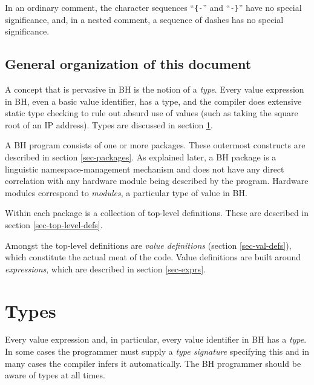 \documentclass[twoside,letterpaper]{article}
\newcommand{\BH}{BH}
\newcommand{\te}[1]{\texttt{#1}}
\newcommand{\qbs}[1]{``\mbox{\te{#1}}''}
\begin{document}
In an ordinary comment, the character sequences {\qbs{\{-}} and
{\qbs{-\}}} have no special significance, and, in a nested comment, a
sequence of dashes has no special significance.


\subsection*{General organization of this document}

A concept that is pervasive in {\BH} is the notion of a
{\emph{type}}.  Every value expression in {\BH}, even a basic value
identifier, has a type, and the compiler does extensive static type
checking to rule out absurd use of values (such as taking the square
root of an IP address).  Types are discussed in section
{\ref{sec-type}}.

A {\BH} program consists of one or more packages.  These outermost
constructs are described in section {\ref{sec-packages}}.  As
explained later, a {\BH} package is a linguistic
namespace-management mechanism and does not have any direct
correlation with any hardware module being described by the program.
Hardware modules correspond to {\emph{modules}}, a particular type of
value in {\BH}.

Within each package is a collection of top-level definitions.  These
are described in section {\ref{sec-top-level-defs}}.

Amongst the top-level definitions are {\emph{value definitions}}
(section {\ref{sec-val-defs}}), which constitute the actual meat of
the code.  Value definitions are built around {\emph{expressions}},
which are described in section {\ref{sec-exprs}}.


\section{Types}

\label{sec-type}

Every value expression and, in particular, every value identifier in
{\BH} has a {\emph{type}}.  In some cases the programmer must supply
a {\emph{type signature}}{} specifying this and in many cases the
compiler infers it automatically.  The {\BH} programmer should be
aware of types at all times.
\end{document}
